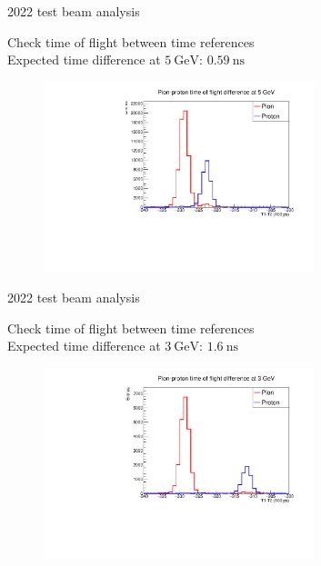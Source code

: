 \documentclass[xcolor={dvipsnames}]{beamer}
\begin{document}
\begin{frame}{2022 test beam analysis}
  \vspace{0.0cm}
  \begin{center}
    {\large Check time of flight between time references}\\
    {\normalsize Expected time difference at $\SI{5}{\giga\eV}$: $\SI{0.59}{\nano\second}$}
  \end{center}
  \begin{figure}
    \centering
    \includegraphics[width = 0.7\textwidth]{Figs/PionProton_TimeDiff_5GeV.pdf}
  \end{figure}
\end{frame}

\begin{frame}{2022 test beam analysis}
  \vspace{0.0cm}
  \begin{center}
    {\large Check time of flight between time references}\\
    {\normalsize Expected time difference at $\SI{3}{\giga\eV}$: $\SI{1.6}{\nano\second}$}
  \end{center}
  \begin{figure}
    \centering
    \includegraphics[width = 0.7\textwidth]{Figs/PionProton_TimeDiff_3GeV.pdf}
  \end{figure}
\end{frame}
\end{document}
